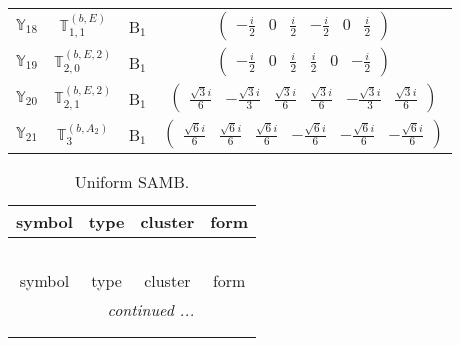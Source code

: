 \documentclass[fleqn,10pt,landscape]{article}
\begin{document}
\begin{itemize}
\begin{center}
\begin{longtable}{c|c|c|c}
$ \mathbb{Y}_{18} $ & $\mathbb{T}_{1,1}^{(b,E)}$ & B$_{1}$ & $\begin{pmatrix} - \frac{i}{2} & 0 & \frac{i}{2} & - \frac{i}{2} & 0 & \frac{i}{2} \end{pmatrix}$ \\
$ \mathbb{Y}_{19} $ & $\mathbb{T}_{2,0}^{(b,E,2)}$ & B$_{1}$ & $\begin{pmatrix} - \frac{i}{2} & 0 & \frac{i}{2} & \frac{i}{2} & 0 & - \frac{i}{2} \end{pmatrix}$ \\
$ \mathbb{Y}_{20} $ & $\mathbb{T}_{2,1}^{(b,E,2)}$ & B$_{1}$ & $\begin{pmatrix} \frac{\sqrt{3} i}{6} & - \frac{\sqrt{3} i}{3} & \frac{\sqrt{3} i}{6} & \frac{\sqrt{3} i}{6} & - \frac{\sqrt{3} i}{3} & \frac{\sqrt{3} i}{6} \end{pmatrix}$ \\
$ \mathbb{Y}_{21} $ & $\mathbb{T}_{3}^{(b,A_{2})}$ & B$_{1}$ & $\begin{pmatrix} \frac{\sqrt{6} i}{6} & \frac{\sqrt{6} i}{6} & \frac{\sqrt{6} i}{6} & - \frac{\sqrt{6} i}{6} & - \frac{\sqrt{6} i}{6} & - \frac{\sqrt{6} i}{6} \end{pmatrix}$ \\
\end{longtable}
\end{center}
\begin{center}
\renewcommand{\arraystretch}{1.3}
\begin{longtable}{c|c|c|c}
\caption{Uniform SAMB.}
 \\
 \hline \hline
symbol & type & cluster & form \\ \hline \endfirsthead

\multicolumn{3}{l}{\tablename\ \thetable{}} \\
 \hline \hline
symbol & type & cluster & form \\ \hline \endhead

 \hline \hline
\multicolumn{3}{r}{\footnotesize\it continued ...} \\ \endfoot

 \hline \hline
\multicolumn{3}{r}{} \\ \endlastfoot


\end{longtable}
\end{center}
\end{itemize}
\end{document}
